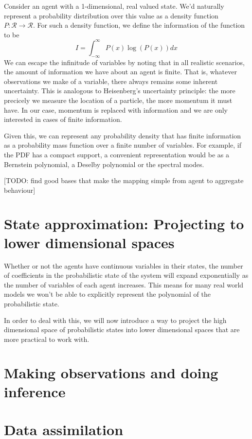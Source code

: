 \documentclass[letterpaper,twocolumn,10pt]{article}
\begin{document}
Consider an agent with a 1-dimensional, real valued state. We'd naturally represent a probability distribution over this value as a density function $P:\mathcal{R} \rightarrow \mathcal{R}$. For such a density function, we define the information of the function to be
\[
I = \int_{-\infty}^\infty P(x) \log(P(x)) dx
\]
We can escape the infinitude of variables by noting that in all realistic scenarios, the amount of information we have about an agent is finite. That is, whatever observations we make of a variable, there always remains some inherent uncertainty. This is analogous to Heisenberg's uncertainty principle: the more precicely we measure the location of a particle, the more momentum it must have. In our case, momentum is replaced with information and we are only interested in cases of finite information.

Given this, we can represent any probability density that has finite information as a probability mass function over a finite number of variables. For example, if the PDF has a compact support, a convenient representation would be as a Bernstein polynomial, a Deselby polynomial or the spectral modes.

[TODO: find good bases that make the mapping simple from agent to aggregate behaviour]

\section{State approximation: Projecting to lower dimensional spaces}

Whether or not the agents have continuous variables in their states, the number of coefficients in the probabilistic state of the system will expand exponentially as the number of variables of each agent increases. This means for many real world models we won't be able to explicitly represent the polynomial of the probabilistic state.

In order to deal with this, we will now introduce a way to project the high dimensional space of probabilistic states into lower dimensional spaces that are more practical to work with.

\section{Making observations and doing inference}

\section{Data assimilation}
\end{document}
